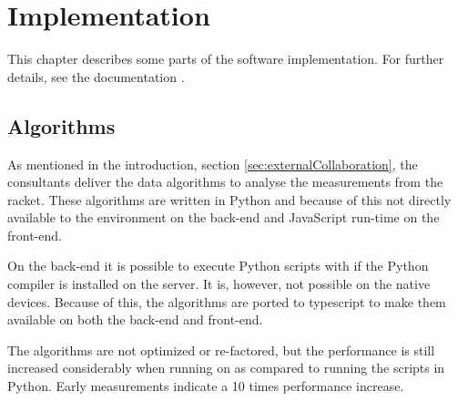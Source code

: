 \chapter{Implementation}
This chapter describes some parts of the software implementation.
For further details, see the documentation .

\section{Algorithms}
As mentioned in the introduction, section \ref{sec:externalCollaboration}, the consultants deliver the data algorithms to analyse the measurements from the racket.
These algorithms are written in Python and because of this not directly available to the  environment on the back-end and JavaScript run-time on the front-end.

On the back-end it is possible to execute Python scripts with  if the Python compiler is installed on the server.
It is, however, not possible on the native devices.
Because of this, the algorithms are ported to \gls{typescript} to make them available on both the back-end and front-end.

The algorithms are not optimized or re-factored, but the performance is still increased considerably when running on  as compared to running the scripts in Python.
Early measurements indicate a 10 times performance increase.

